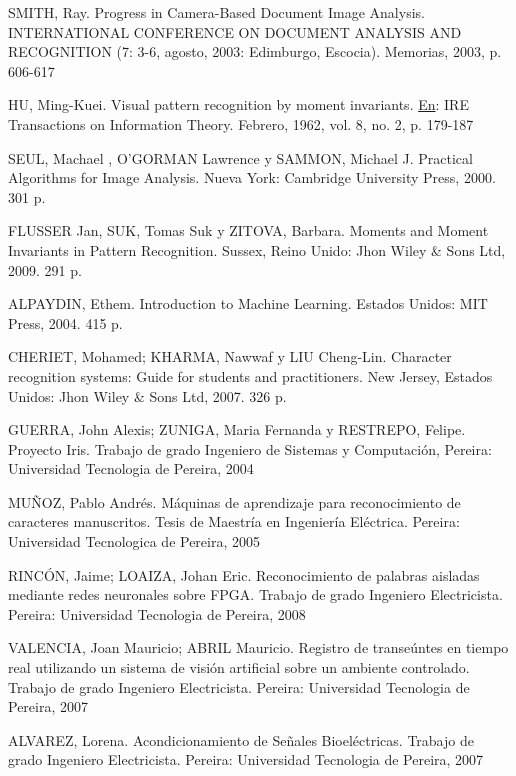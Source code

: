 \documentclass[a4paper, 11pt, oneside]{report}
\begin{document}
	SMITH, Ray. Progress in Camera-Based Document Image Analysis. INTERNATIONAL CONFERENCE ON DOCUMENT ANALYSIS AND RECOGNITION (7: 3-6, agosto, 2003: Edimburgo, Escocia). Memorias, 2003, p. 606-617
	
	HU, Ming-Kuei. Visual pattern recognition by moment invariants. \underline{En}: IRE Transactions on Information Theory. Febrero, 1962, vol. 8, no. 2, p. 179-187
	
	SEUL, Machael , O'GORMAN Lawrence y SAMMON, Michael J. Practical Algorithms for Image Analysis. Nueva York: Cambridge University Press, 2000. 301 p.
	
	FLUSSER Jan, SUK, Tomas Suk y ZITOVA, Barbara. Moments and Moment Invariants in Pattern Recognition. Sussex, Reino Unido: Jhon Wiley \& Sons Ltd, 2009. 291 p.
	
	ALPAYDIN, Ethem. Introduction to Machine Learning. Estados Unidos: MIT Press, 2004. 415 p.
	
	CHERIET, Mohamed; KHARMA, Nawwaf y LIU Cheng-Lin. Character recognition systems: Guide for students and practitioners. New Jersey, Estados Unidos: Jhon Wiley \& Sons Ltd, 2007. 326 p.
	
	GUERRA, John Alexis; ZUNIGA, Maria Fernanda y RESTREPO, Felipe. Proyecto Iris. Trabajo de grado Ingeniero de Sistemas y Computación, Pereira: Universidad Tecnologia de Pereira, 2004
	
	MUÑOZ, Pablo Andrés. Máquinas de aprendizaje para reconocimiento de caracteres manuscritos. Tesis de Maestría en Ingeniería Eléctrica. Pereira: Universidad Tecnologica de Pereira, 2005
	
	RINCÓN, Jaime; LOAIZA, Johan Eric. Reconocimiento de palabras aisladas mediante redes neuronales sobre FPGA. Trabajo de grado Ingeniero Electricista. Pereira: Universidad Tecnologia de Pereira, 2008
	
	VALENCIA, Joan Mauricio; ABRIL Mauricio. Registro de transeúntes en tiempo real utilizando un sistema de visión artificial sobre un ambiente controlado. Trabajo de grado Ingeniero Electricista. Pereira: Universidad Tecnologia de Pereira, 2007
	
	ALVAREZ, Lorena. Acondicionamiento de Señales Bioeléctricas. Trabajo de grado Ingeniero Electricista. Pereira: Universidad Tecnologia de Pereira, 2007
\end{document}

